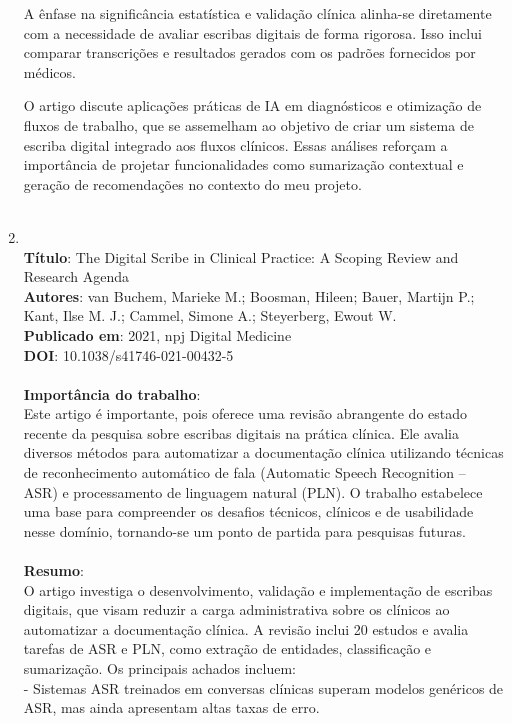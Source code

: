 \documentclass[
	article,
	11pt,
	oneside,
	a4paper,
	english,
	brazil,
	sumario=tradicional
	]{abntex2}
\begin{document}
\begin{enumerate}
A ênfase na significância estatística e validação clínica alinha-se diretamente com a necessidade de avaliar escribas digitais de forma rigorosa. Isso inclui comparar transcrições e resultados gerados com os padrões fornecidos por médicos.

O artigo discute aplicações práticas de IA em diagnósticos e otimização de fluxos de trabalho, que se assemelham ao objetivo de criar um sistema de escriba digital integrado aos fluxos clínicos. Essas análises reforçam a importância de projetar funcionalidades como sumarização contextual e geração de recomendações no contexto do meu projeto.
\\ \\
\item \cite{van2021digital}\\
\textbf{Título}: The Digital Scribe in Clinical Practice: A Scoping Review and Research Agenda\\
\textbf{Autores}: van Buchem, Marieke M.; Boosman, Hileen; Bauer, Martijn P.; Kant, Ilse M. J.; Cammel, Simone A.; Steyerberg, Ewout W.\\
\textbf{Publicado em}: 2021, npj Digital Medicine\\
\textbf{DOI}: 10.1038/s41746-021-00432-5\\
\\
\textbf{Importância do trabalho}:\\
Este artigo é importante, pois oferece uma revisão abrangente do estado recente da pesquisa sobre escribas digitais na prática clínica. Ele avalia diversos métodos para automatizar a documentação clínica utilizando técnicas de reconhecimento automático de fala (Automatic Speech Recognition -- ASR) e processamento de linguagem natural (PLN). O trabalho estabelece uma base para compreender os desafios técnicos, clínicos e de usabilidade nesse domínio, tornando-se um ponto de partida para pesquisas futuras.\\
\\
\textbf{Resumo}:\\
O artigo investiga o desenvolvimento, validação e implementação de escribas digitais, que visam reduzir a carga administrativa sobre os clínicos ao automatizar a documentação clínica. A revisão inclui 20 estudos e avalia tarefas de ASR e PLN, como extração de entidades, classificação e sumarização. Os principais achados incluem:\\
- Sistemas ASR treinados em conversas clínicas superam modelos genéricos de ASR, mas ainda apresentam altas taxas de erro.\\

\end{enumerate}
\end{document}
